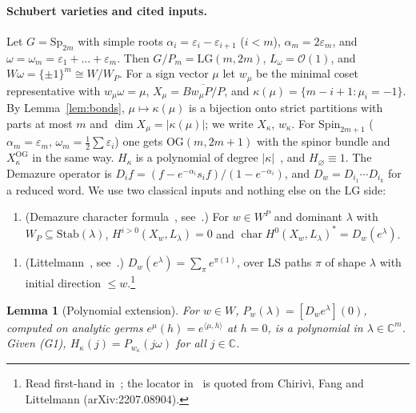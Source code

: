 \documentclass[submission]{FPSAC2027}
\newtheorem{lemma}[theorem]{Lemma}
\theoremstyle{definition}
\theoremstyle{remark}
\newcommand{\LG}{\mathrm{LG}}
\newcommand{\OG}{\mathrm{OG}}
\newcommand{\cO}{\mathcal{O}}
\newcommand{\C}{\mathbb{C}}
\begin{document}
\paragraph{Schubert varieties and cited inputs.} Let $G=\mathrm{Sp}_{2m}$ with simple roots
$\alpha_i=\varepsilon_i-\varepsilon_{i+1}$ ($i<m$), $\alpha_m=2\varepsilon_m$, and
$\omega=\omega_m=\varepsilon_1+\dots+\varepsilon_m$. Then $G/P_m=\LG(m,2m)$, $L_\omega=\cO(1)$,
and $W\omega=\{\pm1\}^m\cong W/W_P$. For a sign vector $\mu$ let $w_\mu$ be the minimal coset
representative with $w_\mu\omega=\mu$, $X_\mu=\overline{Bw_\mu P/P}$, and
$\kappa(\mu)=\{m-i+1:\mu_i=-1\}$. By Lemma~\ref{lem:bonds}, $\mu\mapsto\kappa(\mu)$ is a bijection
onto strict partitions with parts at most $m$ and $\dim X_\mu=|\kappa(\mu)|$; we write
$X_\kappa$, $w_\kappa$. For $\mathrm{Spin}_{2m+1}$ ($\alpha_m=\varepsilon_m$,
$\omega_m=\tfrac12\sum\varepsilon_i$) one gets $\OG(m,2m+1)$ with the spinor bundle and
$X^{\OG}_\kappa$ in the same way. $H_\kappa$ is a polynomial of degree $|\kappa|$~\cite{Kleiman66},
and $H_\varnothing\equiv1$. The Demazure operator is $D_if=(f-e^{-\alpha_i}s_if)/(1-e^{-\alpha_i})$,
and $D_w=D_{i_1}\cdots D_{i_k}$ for a reduced word. We use two classical inputs and nothing else
on the $\LG$ side:
\begin{enumerate}[label=(G1),leftmargin=*]
\item (Demazure character formula~\cite{Dem74}, see~\cite[Ch.~3]{BK05}.) For $w\in W^P$ and
dominant $\lambda$ with $W_P\subseteq\mathrm{Stab}(\lambda)$, $H^{i>0}(X_w,L_\lambda)=0$ and
$\operatorname{char}H^0(X_w,L_\lambda)^*=D_w(e^\lambda)$.
\end{enumerate}
\begin{enumerate}[label=(LS),leftmargin=*]
\item (Littelmann~\cite[\S5.2]{Lit94}, see~\cite[p.~305]{LitICM}.) $D_w(e^\lambda)=\sum_\pi
e^{\pi(1)}$, over LS paths $\pi$ of shape $\lambda$ with initial direction $\le w$.\footnote{Read
first-hand in~\cite{LitICM}; the locator in~\cite{Lit94} is quoted from Chirivì, Fang and
Littelmann (arXiv:2207.08904).}
\end{enumerate}

\begin{lemma}[Polynomial extension]\label{lem:P}
For $w\in W$, $P_w(\lambda)=[D_we^\lambda](0)$, computed on analytic germs
$e^\mu(h)=e^{\langle\mu,h\rangle}$ at $h=0$, is a polynomial in $\lambda\in\C^m$. Given (G1),
$H_\kappa(j)=P_{w_\kappa}(j\omega)$ for all $j\in\C$.
\end{lemma}
\end{document}
